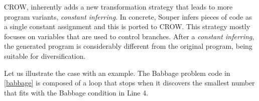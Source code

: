 \label{CROW:constant_inferring}
CROW, inherently adds a new transformation strategy that leads to more \wasm program variants, \emph{constant inferring}.
In concrete, Souper infers pieces of code as a single constant assignment and this is ported to CROW. 
This strategy mostly focuses on variables that are used to control branches.
After a \emph{constant inferring}, the generated program is considerably different from the original program, being suitable for diversification.


Let us illustrate the case with an example.
The Babbage problem code in \autoref{babbage} is composed of a loop that stops when it discovers the smallest number that fits with the Babbage condition in Line 4.


